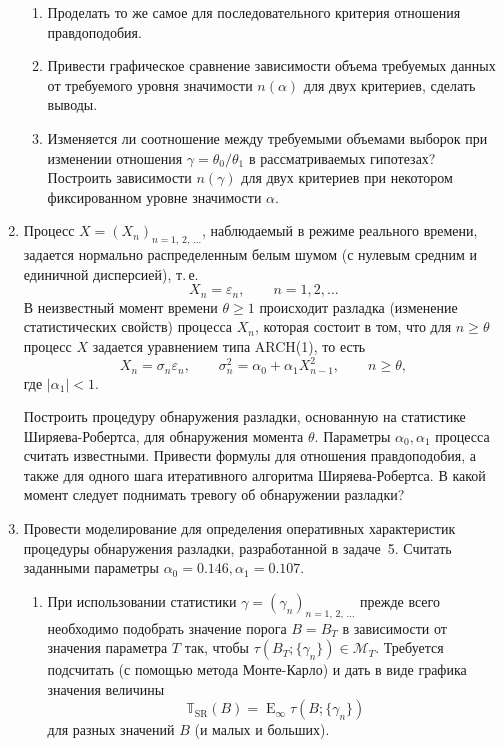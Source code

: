 \documentclass[a4paper,14pt]{extreport}
\renewcommand{\=}[1]{\stackrel{#1}{=}} %
\newcommand{\Expect}{\mathop{{}\mathrm{E}}}
\newcommand{\discretetime}{n = 1,\,2,\,\ldots}
\newcommand{\newprocessd}[1]{
    \ensuremath{
        #1 = \left(#1 _n\right)_{\discretetime}
    }
}
\begin{document}
\begin{enumerate}
\begin{enumerate}
        \item Проделать то же самое для 
        последовательного критерия отношения
        правдоподобия.

        \item Привести графическое сравнение
        зависимости объема требуемых данных
        от требуемого уровня значимости 
        $n(\alpha)$ для двух критериев, сделать
        выводы.

        \item Изменяется ли соотношение 
        между требуемыми объемами выборок
        при изменении отношения $\gamma = \theta_0 / \theta_1$
        в рассматриваемых гипотезах? 
        Построить зависимости $n(\gamma)$
        для двух критериев при некотором фиксированном
        уровне значимости $\alpha$.
    \end{enumerate}


    \item Процесс $\newprocessd{X}$, наблюдаемый
    в режиме реального времени, задается
    нормально распределенным белым шумом
    (с нулевым  средним и единичной дисперсией), 
    т.\,е. 
    \[
    X_n = \varepsilon_n, \qquad n=1, 2, \ldots
    \]
    В неизвестный момент времени $\theta \geqslant 1$
    происходит разладка 
    (изменение статистических свойств) процесса
    $X_n$, которая состоит в том, что 
    для $n \geqslant \theta$ процесс $X$
    задается уравнением типа ARCH(1), то есть
    \[
    X_n = \sigma_n \varepsilon_n,
    \qquad
    \sigma^2_n = \alpha_0 + \alpha_1 X^2_{n-1},
    \qquad n \geqslant \theta,
    \]
    где $|\alpha_1| < 1$. 

    Построить процедуру обнаружения
    разладки, основанную на статистике Ширяева-Робертса,
    для обнаружения момента $\theta$.
    Параметры $\alpha_0, \alpha_1$
    процесса считать известными. 
    Привести формулы для отношения правдоподобия,
    а также для одного шага итеративного алгоритма
    Ширяева-Робертса. В какой момент
    следует поднимать тревогу об обнаружении разладки?


    \item Провести моделирование для определения
    оперативных характеристик процедуры обнаружения
    разладки, разработанной в задаче~5. Считать
    заданными параметры $\alpha_0 = 0.146,
    \alpha_1 = 0.107$.
    \begin{enumerate}
        \item При использовании статистики 
        $\newprocessd{\gamma}$ прежде
        всего необходимо подобрать
        значение порога $B = B_T$ в зависимости
        от значения параметра $T$ так, чтобы
        $\tau (B_T ; \{\gamma_n\}) \in \mathcal{M}_T$.
        Требуется подсчитать (с помощью метода
        Монте-Карло) и дать в виде графика
        значения величины
        \[
        \mathbb{T}_{\mathrm{SR}}(B) = 
        {\textstyle \Expect_{\infty}} \tau(B; \{\gamma_n\})
        \]
        для разных значений $B$ (и малых и больших).


\end{enumerate}
\end{enumerate}
\end{document}
